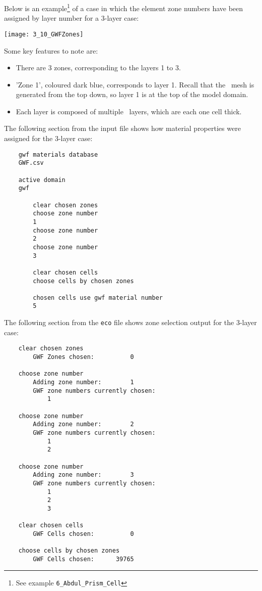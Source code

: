 {Below is an example\footnote{See example \texttt{6\_Abdul\_Prism\_Cell}} of a case in which the element zone numbers have been assigned by layer number for a 3-layer case:

\texttt{[image: 3\_10\_GWFZones]}

Some key features to note are:
\begin{itemize}
    \item There are 3 zones, corresponding to the layers 1 to 3.
    \item 'Zone 1', coloured dark blue, corresponds to layer 1.  Recall that the \mfus\ mesh is generated from the top down, so layer 1 is at the top of the model domain.
    \item Each layer is composed of multiple \mf\ layers, which are each one cell thick.
\end{itemize}

The following section from the input file shows how material properties were assigned for the 3-layer case:
\begin{verbatim}
    gwf materials database
    GWF.csv

    active domain
    gwf

        clear chosen zones
        choose zone number
        1
        choose zone number
        2
        choose zone number
        3

        clear chosen cells
        choose cells by chosen zones

        chosen cells use gwf material number
        5
\end{verbatim}

The following section from the \texttt{eco} file shows zone selection output for the 3-layer case:
\begin{verbatim}
    clear chosen zones
    	GWF Zones chosen:          0

    choose zone number
    	Adding zone number:        1
    	GWF zone numbers currently chosen:
    	    1

    choose zone number
    	Adding zone number:        2
    	GWF zone numbers currently chosen:
    	    1
    	    2

    choose zone number
    	Adding zone number:        3
    	GWF zone numbers currently chosen:
    	    1
    	    2
    	    3

    clear chosen cells
    	GWF Cells chosen:          0

    choose cells by chosen zones
    	GWF Cells chosen:      39765
\end{verbatim}

}
